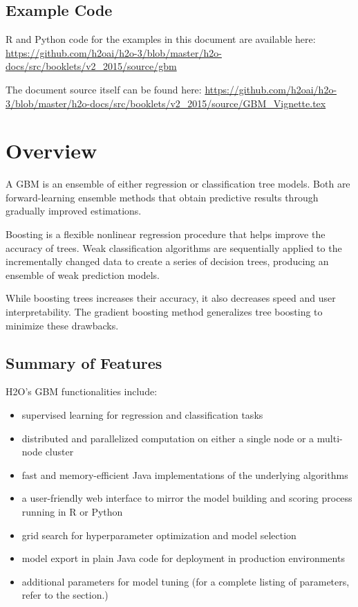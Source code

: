 \newcommand{\waterVersion}{3.0.1.4}



\subsection{Example Code}

R and Python code for the examples in this document are available here:
\url{https://github.com/h2oai/h2o-3/blob/master/h2o-docs/src/booklets/v2_2015/source/gbm}

The document source itself can be found here:
\url{https://github.com/h2oai/h2o-3/blob/master/h2o-docs/src/booklets/v2_2015/source/GBM_Vignette.tex}

\section{Overview}

A GBM is an ensemble of either regression or classification tree models.
Both are forward-learning ensemble methods that obtain predictive results through gradually improved estimations.

Boosting is a flexible nonlinear regression procedure that helps improve the accuracy of trees. Weak classification algorithms are sequentially applied to the incrementally changed data to create a series of decision trees, producing an ensemble of weak prediction models. 

While boosting trees increases their accuracy, it also decreases speed and user interpretability.
The gradient boosting method generalizes tree boosting to minimize these drawbacks.

\subsection{Summary of Features}
H2O's GBM functionalities include:

\begin{itemize}
\item supervised learning for regression and classification tasks
\item distributed and parallelized computation on either a single node or a multi-node cluster
\item fast and memory-efficient Java implementations of the underlying algorithms
\item a user-friendly web interface to mirror the model building and scoring process running in R or Python
\item grid search for hyperparameter optimization and model selection
\item model export in plain Java code for deployment in production environments
\item additional parameters for model tuning (for a complete listing of parameters, refer to the section.)
\end{itemize}


